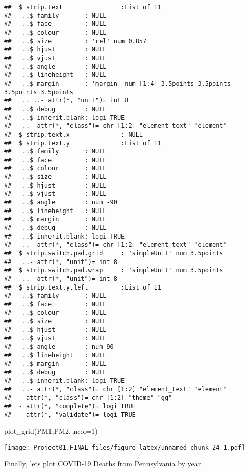 \documentclass[
]{article}
\newenvironment{Shaded}{\begin{snugshade}}{\end{snugshade}}
\newcommand{\AttributeTok}[1]{\textcolor[rgb]{0.77,0.63,0.00}{#1}}
\newcommand{\DecValTok}[1]{\textcolor[rgb]{0.00,0.00,0.81}{#1}}
\newcommand{\FunctionTok}[1]{\textcolor[rgb]{0.00,0.00,0.00}{#1}}
\newcommand{\NormalTok}[1]{#1}
\begin{document}
\begin{verbatim}
##  $ strip.text                :List of 11
##   ..$ family       : NULL
##   ..$ face         : NULL
##   ..$ colour       : NULL
##   ..$ size         : 'rel' num 0.857
##   ..$ hjust        : NULL
##   ..$ vjust        : NULL
##   ..$ angle        : NULL
##   ..$ lineheight   : NULL
##   ..$ margin       : 'margin' num [1:4] 3.5points 3.5points 3.5points 3.5points
##   .. ..- attr(*, "unit")= int 8
##   ..$ debug        : NULL
##   ..$ inherit.blank: logi TRUE
##   ..- attr(*, "class")= chr [1:2] "element_text" "element"
##  $ strip.text.x              : NULL
##  $ strip.text.y              :List of 11
##   ..$ family       : NULL
##   ..$ face         : NULL
##   ..$ colour       : NULL
##   ..$ size         : NULL
##   ..$ hjust        : NULL
##   ..$ vjust        : NULL
##   ..$ angle        : num -90
##   ..$ lineheight   : NULL
##   ..$ margin       : NULL
##   ..$ debug        : NULL
##   ..$ inherit.blank: logi TRUE
##   ..- attr(*, "class")= chr [1:2] "element_text" "element"
##  $ strip.switch.pad.grid     : 'simpleUnit' num 3.5points
##   ..- attr(*, "unit")= int 8
##  $ strip.switch.pad.wrap     : 'simpleUnit' num 3.5points
##   ..- attr(*, "unit")= int 8
##  $ strip.text.y.left         :List of 11
##   ..$ family       : NULL
##   ..$ face         : NULL
##   ..$ colour       : NULL
##   ..$ size         : NULL
##   ..$ hjust        : NULL
##   ..$ vjust        : NULL
##   ..$ angle        : num 90
##   ..$ lineheight   : NULL
##   ..$ margin       : NULL
##   ..$ debug        : NULL
##   ..$ inherit.blank: logi TRUE
##   ..- attr(*, "class")= chr [1:2] "element_text" "element"
##  - attr(*, "class")= chr [1:2] "theme" "gg"
##  - attr(*, "complete")= logi TRUE
##  - attr(*, "validate")= logi TRUE
\end{verbatim}

\begin{Shaded}
\begin{Highlighting}[]
\FunctionTok{plot\_grid}\NormalTok{(PM1,PM2, }\AttributeTok{ncol=}\DecValTok{1}\NormalTok{)}
\end{Highlighting}
\end{Shaded}

\texttt{[image: Project01.FINAL\_files/figure-latex/unnamed-chunk-24-1.pdf]}

Finally, lets plot COVID-19 Deaths from Pennsylvania by year.
\end{document}

